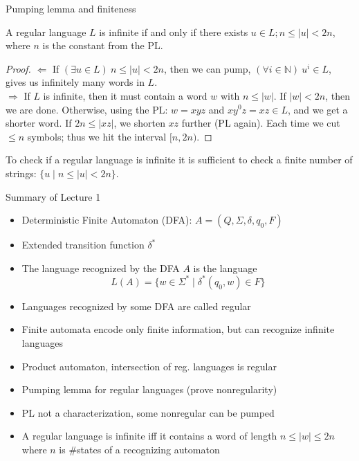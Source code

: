 \documentclass[handout]{beamer}
\begin{document}
\begin{frame}{Pumping lemma and finiteness}
	
	\begin{theorem}
	A regular language $L$ is infinite if and only if there exists $u\in L; n\leq |u|<2n$, where $n$ is the constant from the PL.
	\end{theorem}
	\begin{proof}
        \alert{\Large$\Leftarrow$} If $(\exists u\in L)\ n\leq |u|<2n$, then we can pump, $(\forall i \in \mathbb{N})\ u^i \in L$, gives us infinitely many words in $L$.\\	
        \alert{\Large$\Rightarrow$} If $L$ is infinite, then it must contain a word $w$ with $n\leq |w|$. If $|w|<2n$, then we are done. Otherwise, using the PL: $w=xyz$ and $x{y^0}z=xz\in L$, and we get a shorter word. If $2n\leq |xz|$, we shorten  $xz$  further (PL again). Each time we cut $\leq n$ symbols; thus we hit the interval $[n,2n)$.
	\end{proof}
	
	\begin{corollary}To check if a regular language is infinite it is sufficient to check a finite number of strings:  $\{u\mid n\leq |u|<2n\}$.
	\end{corollary}

\end{frame}


\begin{frame}{Summary of Lecture 1}

    \begin{itemize}
        \item  \alert{Deterministic Finite Automaton (DFA)}: $A=(Q,\Sigma,\delta,q_0,F)$
        \item Extended transition function $\delta^*$
        \item The language \alert{recognized} by the DFA $A$ is the language 
        $$
        L(A)=\{w\in \Sigma^* \mid \delta^*(q_0,w)\in F\}
        $$    
        \item Languages recognized by some DFA are called \alert{regular}
        \item Finite automata encode only finite information, but can recognize infinite languages
        \item Product automaton, intersection of reg. languages is regular   
        \item \alert{Pumping lemma for regular languages} (prove nonregularity)
        \item PL not a characterization, some nonregular can be pumped
        \item A regular language is infinite iff it contains a word of length $n\leq |w|\leq 2n$ where $n$ is \#states of a recognizing automaton
    \end{itemize}

\end{frame}
\end{document}
